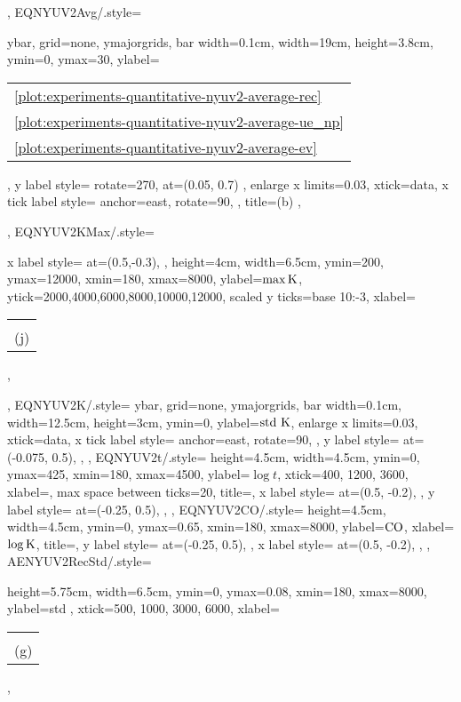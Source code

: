 {{    },
    EQNYUV2Avg/.style={
        ybar,
        grid=none,
        ymajorgrids,
		bar width=0.1cm,
		width=19cm,
		height=3.8cm,
		ymin=0,
		ymax=30,
		ylabel=\begin{tabular}{l}\ref{plot:experiments-quantitative-nyuv2-average-rec} \ARec\\\ref{plot:experiments-quantitative-nyuv2-average-ue_np} \AUE\\\ref{plot:experiments-quantitative-nyuv2-average-ev} \AEV\end{tabular},
		y label style={
            rotate=270,
            at={(0.05, 0.7)}
        },
		enlarge x limits=0.03,
		xtick=data,
		x tick label style={
			anchor=east,
			rotate=90,
		},
		title=(b) \NYU,
    },
    EQNYUV2KMax/.style={
        x label style={
            at={(0.5,-0.3)},
        },
        height=4cm,
        width=6.5cm,
        ymin=200,
        ymax=12000,
        xmin=180,
        xmax=8000,
        ylabel=$\max\text{K}$,
        ytick={2000,4000,6000,8000,10000,12000},
        scaled y ticks={base 10:-3},
        xlabel=\begin{tabular}{c}\K\\(j)\end{tabular},
    },
    EQNYUV2K/.style={
        ybar,
        grid=none,
        ymajorgrids,
		bar width=0.1cm,
		width=12.5cm,
		height=3cm,
		ymin=0,
		ylabel=$\text{std }\text{K}$,
		enlarge x limits=0.03,
		xtick=data,
		x tick label style={
			anchor=east,
			rotate=90,
		},
		y label style={
			at={(-0.075, 0.5)},
		},
    },
    EQNYUV2t/.style={
        height=4.5cm,
        width=4.5cm,
        ymin=0,
        ymax=425,
        xmin=180,
        xmax=4500,
        ylabel=$\log t$,
        xtick={400, 1200, 3600},
        xlabel=\K,
        max space between ticks=20,
        title=\NYU,
        x label style={
    		at={(0.5, -0.2)},
        },
        y label style={
    		at={(-0.25, 0.5)},
        },
    },
    EQNYUV2CO/.style={
        height=4.5cm,
        width=4.5cm,
        ymin=0,
        ymax=0.65,
        xmin=180,
        xmax=8000,
        ylabel=$\text{CO}$,
        xlabel=$\log\text{K}$,
        title=\NYU,
        y label style={
    		at={(-0.25, 0.5)},
        },
        x label style={
    		at={(0.5, -0.2)},
        },
    },
    AENYUV2RecStd/.style={
        height=5.75cm,
        width=6.5cm,
        ymin=0,
        ymax=0.08,
        xmin=180,
        xmax=8000,
        ylabel=std \Rec,
        xtick={500, 1000, 3000, 6000},
        xlabel=\begin{tabular}{c}\K\\(g)\end{tabular},
}}
